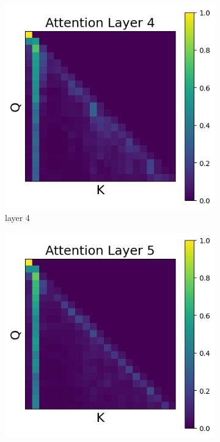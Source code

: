 \documentclass[11pt]{article}
\begin{document}
\begin{figure}[t]
  \begin{subfigure}[t]{0.24\textwidth}
    \centering
    \includegraphics[width=1.4\columnwidth]{figures/intervention3/layer_4.png}
    \caption{layer 4}
    \label{fig:intervention3_layer4}
  \end{subfigure}\hfill
  \begin{subfigure}[t]{0.24\textwidth}
    \centering
    \includegraphics[width=1.4\columnwidth]{figures/intervention3/layer_5.png}

\end{subfigure}
\end{figure}
\end{document}
